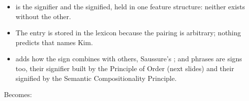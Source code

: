 \documentclass[a4paper,landscape,headrule,footrule]{foils}
\begin{document}
\begin{center}
\end{center}
\vspace{-2ex}
\begin{itemize}\addtolength{\itemsep}{-1.5ex}
\item {} is the signifier and  the signified, held in
  one feature structure: neither exists without the other.
\item The entry is stored in the lexicon because the pairing is
  arbitrary; nothing predicts that  names Kim.
\item {} adds how the sign combines with others, Saussure's
  ; and phrases are signs too, their
  signifier built by the Principle of Order (next slides) and their
  signified by the Semantic Compositionality Principle.
\end{itemize}


    Becomes:


\end{document}

